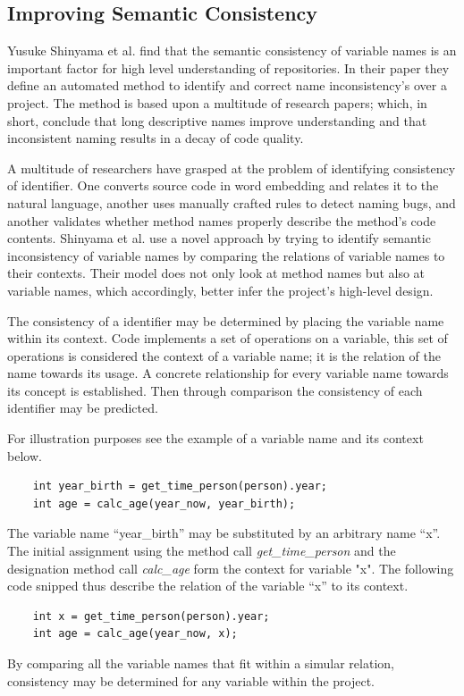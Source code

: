 \documentclass[a4paper,12pt]{article}
\begin{document}
\begin{multicols}{2}
\section*{Improving Semantic Consistency}
Yusuke Shinyama et al. find that the semantic consistency of variable names is an important factor for high level understanding of repositories.\cite{shinyama_improving_2021} In their paper they define an automated method to identify and correct name inconsistency’s over a project. The method is based upon a multitude of research papers; which, in short, conclude that long descriptive names improve understanding and that inconsistent naming results in a decay of code quality.

A multitude of researchers have grasped at the problem of identifying consistency of identifier. One converts source code in word embedding and relates it to the natural language, another uses manually crafted rules to detect naming bugs, and another validates whether method names properly describe the method’s code contents. Shinyama et al. use a novel approach by trying to identify semantic inconsistency of variable names by comparing the relations of variable names to their contexts. Their model does not only look at method names but also at variable names, which accordingly, better infer the project’s high-level design.

The consistency of a identifier may be determined by placing the variable name within its context. Code implements a set of operations on a variable, this set of operations is considered the context of a variable name; it is the relation of the name towards its usage. A concrete relationship for every variable name towards its concept is established. Then through comparison the consistency of each identifier may be predicted. 

For illustration purposes see the example of a variable name and its context below. 
\fontsize{7pt}{7pt}\selectfont
\begin{verbatim}
    int year_birth = get_time_person(person).year;
    int age = calc_age(year_now, year_birth);
\end{verbatim}
\fontsize{12pt}{12pt}\selectfont

The variable name “year\_birth” may be substituted by an arbitrary name “x”. The initial assignment using the method call \textit{get\_time\_person} and the designation method call \textit{calc\_age} form the context for variable "x". The following code snipped thus describe the relation of the variable “x” to its context. 
\fontsize{7pt}{7pt}\selectfont
\begin{verbatim}
    int x = get_time_person(person).year;
    int age = calc_age(year_now, x);
\end{verbatim}
\fontsize{12pt}{12pt}\selectfont
By comparing all the variable names that fit within a simular relation, consistency may be determined for any variable within the project.


\end{multicols}
\end{document}
